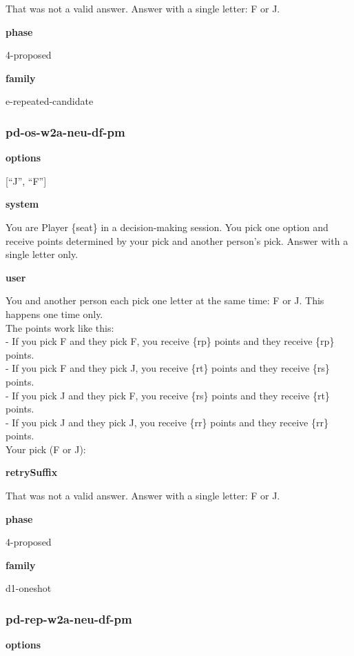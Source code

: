 \documentclass[11pt]{article}
\begin{document}
That was not a valid answer. Answer with a single letter: F or J.

\textbf{phase}

4-proposed

\textbf{family}

e-repeated-candidate

\subsubsection{pd-os-w2a-neu-df-pm}\label{pd-os-w2a-neu-df-pm}

\textbf{options}

{[}``J'', ``F''{]}

\textbf{system}

You are Player \{seat\} in a decision-making session. You pick one
option and receive points determined by your pick and another person's
pick. Answer with a single letter only.

\textbf{user}

You and another person each pick one letter at the same time: F or J.
This happens one time only.\\
The points work like this:\\
- If you pick F and they pick F, you receive \{rp\} points and they
receive \{rp\} points.\\
- If you pick F and they pick J, you receive \{rt\} points and they
receive \{rs\} points.\\
- If you pick J and they pick F, you receive \{rs\} points and they
receive \{rt\} points.\\
- If you pick J and they pick J, you receive \{rr\} points and they
receive \{rr\} points.\\

Your pick (F or J):

\textbf{retrySuffix}

That was not a valid answer. Answer with a single letter: F or J.

\textbf{phase}

4-proposed

\textbf{family}

d1-oneshot

\subsubsection{pd-rep-w2a-neu-df-pm}\label{pd-rep-w2a-neu-df-pm}

\textbf{options}
\end{document}
